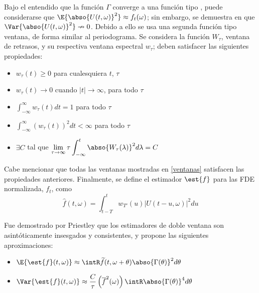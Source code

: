 Bajo el entendido que la función $\Gamma$ converge a una función tipo \dirac, puede 
considerarse que 
$\E{\abso{U(t,\omega)}^{2}} \approx f_t(\omega)$; sin embargo, se demuestra en \cite{Priestley66} 
que $\Var{\abso{U(t,\omega)}^{2}} \nrightarrow 0$.
%
Debido a ello se usa una segunda función tipo ventana,
de forma similar al periodograma.
Se considera la función $W_\tau$, ventana de retrasos, y su respectiva ventana espectral 
$w_\tau$; deben satisfacer las siguientes propiedades:
\begin{itemize}
\item $w_{\tau}(t) \geq 0$ para cualesquiera $t$, $\tau$
\item $w_{\tau}(t) \rightarrow 0$ cuando $\lvert t \lvert \rightarrow \infty$, para todo $\tau$
\item $\displaystyle \int_{-\infty}^{\infty} w_{\tau}(t) dt = 1$ para todo $\tau$
\item $\displaystyle \int_{-\infty}^{\infty} \left( w_{\tau}(t) \right)^{2} dt < \infty$ para todo $\tau$
\item $\exists C$ tal que  
$\displaystyle \lim_{\tau\rightarrow\infty} \tau \int_{-\infty}^{t} \abso{ W_{\tau}(\lambda) }^{2} d\lambda = C$
\end{itemize}

Cabe mencionar que todas las ventanas mostradas en \ref{ventanas} satisfacen las propiedades 
anteriores.
Finalmente, se define el estimador $\est{f}$ para las FDE normalizada, $f_t$, como
\begin{equation*}
\widehat{f}(t,\omega) = \int_{t-T}^{t} w_{T'}(u) \lvert U(t-u,\omega) \lvert^{2} du
\label{estimador_doble_ventana}
\end{equation*}

Fue demostrado por Priestley \cite{Priestley65} que los estimadores de doble ventana son 
asintóticamente insesgados y consistentes, y propone las siguientes aproximaciones:
\begin{itemize}
\item $\displaystyle
\E{\est{f}(t,\omega)} \approx 
\intR \widetilde{f}(t,\omega+\theta) \abso{\Gamma(\theta)}^{2} d\theta$
\item $\displaystyle
\Var{\est{f}(t,\omega)} \approx \frac{C}{\tau} \left( \overline{f}^{2}(\omega) \right)
\intR \abso{\Gamma(\theta)}^{4} d\theta $
\end{itemize}


